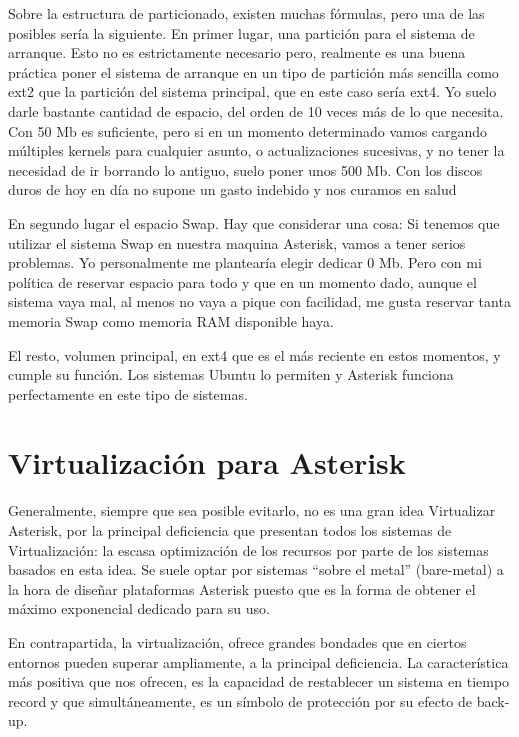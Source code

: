 \begin{enumerate}
Sobre la estructura de particionado, existen muchas fórmulas, pero una de las posibles sería la siguiente. En primer lugar, una partición para el sistema de arranque. Esto no es estrictamente necesario pero, realmente es una buena práctica poner el sistema de arranque en un tipo de partición más sencilla como ext2 que la partición del sistema principal, que en este caso sería ext4. Yo suelo darle bastante cantidad de espacio, del orden de 10 veces más de lo que necesita. Con 50 Mb es suficiente, pero si en un momento determinado vamos cargando múltiples kernels para cualquier asunto, o actualizaciones sucesivas, y no tener la necesidad de ir borrando lo antiguo, suelo poner unos 500 Mb. Con los discos duros de hoy en día no supone un gasto indebido y nos curamos en salud

En segundo lugar el espacio Swap. Hay que considerar una cosa: Si tenemos que utilizar el sistema Swap en nuestra maquina Asterisk, vamos a tener serios problemas. Yo personalmente me plantearía elegir dedicar 0 Mb. Pero con mi política de reservar espacio para todo y que en un momento dado, aunque el sistema vaya mal, al menos no vaya a pique con facilidad, me gusta reservar tanta memoria Swap como memoria RAM disponible haya.

El resto, volumen principal, en ext4 que es el más reciente en estos momentos, y cumple su función. Los sistemas Ubuntu lo permiten y Asterisk funciona perfectamente en este tipo de sistemas.

\end{enumerate}

\section{Virtualización para Asterisk}

Generalmente, siempre que sea posible evitarlo, no es una gran idea Virtualizar Asterisk, por la principal deficiencia que presentan todos los sistemas de Virtualización: la escasa optimización de los recursos por parte de los sistemas basados en esta idea. Se suele optar por sistemas “sobre el metal” (bare-metal) a la hora de diseñar plataformas Asterisk puesto que es la forma de obtener el máximo exponencial dedicado para su uso.

En contrapartida, la virtualización, ofrece grandes bondades que en ciertos entornos pueden superar ampliamente, a la principal deficiencia. La característica más positiva que nos ofrecen, es la capacidad de restablecer un sistema en tiempo record y que simultáneamente, es un símbolo de protección por su efecto de back-up.

